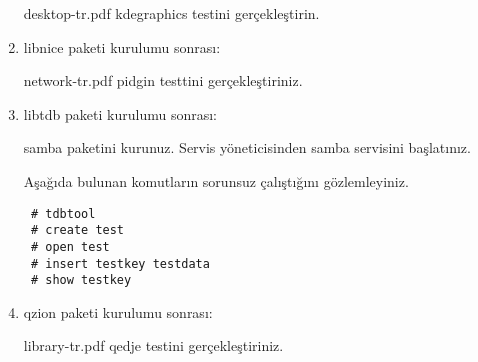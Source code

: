 \documentclass[a4paper,10pt]{article}
\begin{document}
\begin{enumerate}
desktop-tr.pdf kdegraphics testini gerçekleştirin.

\item libnice paketi kurulumu sonrası:

network-tr.pdf pidgin testtini gerçekleştiriniz.

\item libtdb paketi kurulumu sonrası:

samba paketini kurunuz. Servis yöneticisinden samba servisini başlatınız.

Aşağıda bulunan komutların sorunsuz çalıştığını gözlemleyiniz.
\begin{verbatim}
 # tdbtool
 # create test
 # open test 
 # insert testkey testdata
 # show testkey
\end{verbatim}
\item qzion paketi kurulumu sonrası:

library-tr.pdf qedje testini gerçekleştiriniz.

\end{enumerate}
\end{document}

